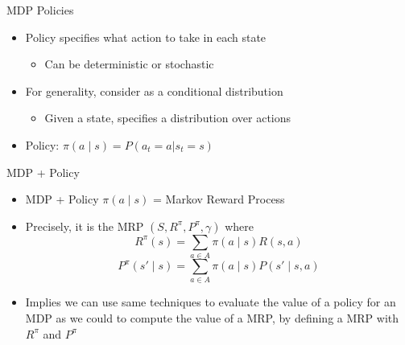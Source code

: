 \documentclass[aspectratio=169]{../latex_main/tntbeamer}  %
\begin{document}
\begin{frame}[c]{MDP Policies}

\begin{itemize}
	\item Policy specifies what action to take in each state
	\begin{itemize}
		\item Can be deterministic or stochastic
	\end{itemize}
	\item For generality, consider as a conditional distribution
	\begin{itemize}
		\item Given a state, specifies a distribution over actions
	\end{itemize}
	\item Policy: $\pi(a \mid s) = P(a_t=a | s_t = s)$
\end{itemize}


\end{frame}
\begin{frame}[c]{MDP + Policy}

\begin{itemize}
	\item MDP + Policy $\pi(a \mid s)$ = Markov Reward Process
	\item Precisely, it is the MRP $(S,R^\pi, P^\pi, \gamma)$ where
	$$R^\pi (s) = \sum_{a\in A} \pi(a\mid s ) R(s,a) $$
   $$P^\pi (s'\mid s) = \sum_{a\in A} \pi(a \mid s) P(s' \mid s,a)$$
   \item Implies we can use same techniques to evaluate the value of a policy  for an MDP as we could to compute the value of a MRP, by defining a
   MRP with $R^\pi$ and $P^\pi$
\end{itemize}

\end{frame}
\end{document}
